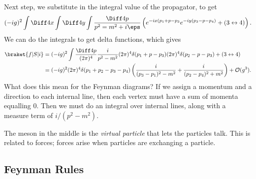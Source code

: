 \documentclass[12pt]{article}
\begin{document}
Next step, we substitute in the integral value of the propagator, to get
\[
	(-i g)^2 \int \Diff 4 x\int \Diff 4 y \int \frac{\Diff 4 p}{p^2 = m^2 + i \eps} \left( e^{-i x(p_1 + p - p_3} e^{-i y (p_3 - p - p_4)} + (3 \leftrightarrow 4) \right).
\]
We can do the integrals to get delta functions, which gives
\begin{align*}
	\braket{f|S|i} &= (-ig)^2 \int \frac{\Diff 4 p}{(2 \pi)^4} \frac{i}{p^2 - m^2} (2 \pi)^{4} \delta(p_1 + p - p_3) (2 \pi)^4 \delta(p_2 - p - p_3) + (3 \leftrightarrow 4) \\
		       &= (-ig)^2 (2 \pi)^4 \delta(p_1 + p_2 - p_3 - p_4) \left( \frac{i}{(p_3 - p_1)^2 - m^2} + \frac{i}{(p_2 - p_4)^2 + m^2} \right) + \mathcal{O}(g^3).
\end{align*}
What does this mean for the Feynman diagrams? If we assign a momentum and a direction to each internal line, then each vertex must have a sum of momenta equalling 0. Then we must do an integral over internal lines, along with a measure term of $i/(p^2 - m^2)$.

The meson in the middle is the \emph{virtual particle} that lets the particles talk. This is related to forces; forces arise when particles are exchanging a particle.


\subsection{Feynman Rules}%
\label{sub:frules}
\end{document}
